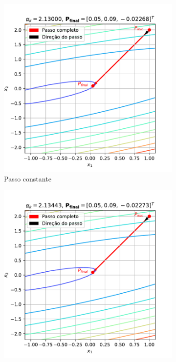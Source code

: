 \documentclass[10pt, a4paper]{article}
\begin{document}
\begin{figure}[htpb]
  \centering
  \begin{subfigure}[b]{0.32\textwidth}
      \centering
      \includegraphics[width=\textwidth]{images/q2a_1.pdf}
      \caption{Passo constante}
      \label{fig:q2a_1}
  \end{subfigure}
  \hfill
  \begin{subfigure}[b]{0.32\textwidth}
      \centering
      \includegraphics[width=\textwidth]{images/q2a_2.pdf}

\end{subfigure}
\end{figure}
\end{document}
